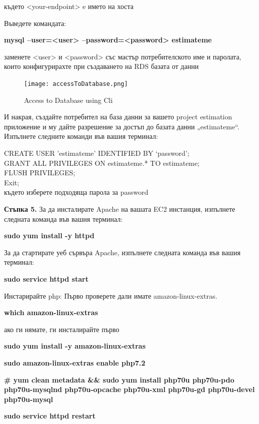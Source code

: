 \documentclass[12pt]{article}
\begin{document}
\medskip

\noindent където <your-endpoint> e името на хоста

\medskip Въведете командата: 

\noindent\textbf{mysql --user=<user> --password=<password> estimateme}

\noindent заменете <user> и <password> със мастър потребителското име и паролата, които конфигурирахте при създаването на RDS базата от данни 

\begin{figure}[h!]
\centering
  \texttt{[image: accessToDatabase.png]}
  \caption{Access to Database using Cli}
\end{figure}


И накрая, създайте потребител на база данни за вашето
project estimation приложение и му дайте разрешение за достъп до базата данни „estimateme“.
Изпълнете следните команди във вашия терминал:

\medskip
CREATE USER 'estimateme' IDENTIFIED BY ‘password';\\
GRANT ALL PRIVILEGES ON estimateme.* TO estimateme;\\
FLUSH PRIVILEGES;\\
Exit;\\
където изберете подходяща парола за  password

\noindent\textbf{Стъпка 5.}
За да инсталирате Apache на вашата EC2 инстанция, изпълнете следната команда във вашия терминал:

\medskip
\textbf{sudo yum install -y httpd}

\medskip
\noindent За да стартирате уеб сървъра Apache, изпълнете следната команда във вашия терминал:

\medskip
\textbf{sudo service httpd start}

\medskip
\noindent Инстарирайте php: Първо проверете дали имате amazon-linux-extras. 

\medskip
\textbf{which amazon-linux-extras}

\medskip
\noindent ако ги нямате, ги инсталирайте първо

\medskip
\textbf{sudo yum install -y amazon-linux-extras}

\medskip
\textbf{sudo amazon-linux-extras enable php7.2}

\medskip
\textbf{\# yum clean metadata \&\&
sudo yum install php70u php70u-pdo php70u-mysqlnd php70u-opcache php70u-xml php70u-gd php70u-devel php70u-mysql}

\medskip
\textbf{sudo service httpd restart}
\end{document}
